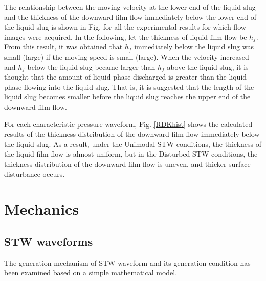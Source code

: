 \documentclass[aps,pre,preprint,groupedaddress,showkeys]{revtex4-2}
\begin{document}
The relationship between the moving velocity at the lower end of the liquid slug and the thickness of the downward film flow immediately below the lower end of the liquid slug is shown in Fig.  for all the experimental results for which flow images were acquired.
In the following, let the thickness of liquid film flow be $h_f$.
From this result, it was obtained that $h_f$ immediately below the liquid slug was small (large) if the moving speed is small (large).
When the velocity increased and $h_f$ below the liquid slug became larger than $h_f$ above the liquid slug, it is thought that the amount of liquid phase discharged is greater than the liquid phase flowing into the liquid slug.
That is, it is suggested that the length of the liquid slug becomes smaller before the liquid slug reaches the upper end of the downward film flow.


For each characteristic pressure waveform, Fig. \ref{RDKhist} shows the calculated results of the thickness distribution of the downward film flow immediately below the liquid slug.
As a result, under the Unimodal STW conditions, the thickness of the liquid film flow is almost uniform, but in the Disturbed STW conditions, the thickness distribution of the downward film flow is uneven, and thicker surface disturbance occurs.



\section{Mechanics}\label{mec}
\subsection{STW waveforms}
The generation mechanism of STW waveform and its generation condition has been examined based on a simple mathematical model.
\end{document}

